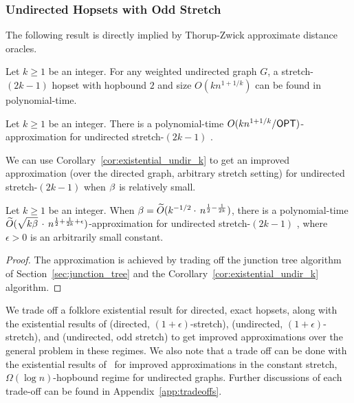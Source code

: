 \subsubsection{Undirected Hopsets with Odd Stretch}

The following result is directly implied by Thorup-Zwick approximate distance oracles.

\begin{lemma}
    Let $k \geq 1$ be an integer. For any weighted undirected graph $G$, a stretch-$(2k-1)$ hopset with hopbound $2$ and size $O(kn^{1+1/k})$ can be found in polynomial-time.
\end{lemma}
\begin{corollary} \label{cor:existential_undir_k}
    Let $k \geq 1$ be an integer. There is a polynomial-time $O(kn^{1+1/k} / {{\sf OPT}})$-approximation for undirected stretch-$(2k-1)$ {\hopset}.
\end{corollary}

We can use Corollary~\ref{cor:existential_undir_k} to get an improved approximation (over the directed graph, arbitrary stretch setting) for undirected stretch-$(2k-1)$ {\hopset} when $\beta$ is relatively small.

\begin{theorem} \label{thm:undir_gen_stretch}
    Let $k \geq 1$ be an integer. When $\beta = \widetilde{O}(k^{-1/2} \cdot \, n^{\frac{1}{2} - \frac{1}{2k}}) $, there is a polynomial-time $\widetilde{O}(\sqrt{k \be \vphantom{\be^k}} \, \cdot \, n^{\frac{1}{2} + \frac{1}{2k} + \epsilon})$-approximation for undirected stretch-$(2k-1)$ {\hopset}, where $\epsilon > 0$ is an arbitrarily small constant.
\end{theorem}
\begin{proof}
    The approximation is achieved by trading off the junction tree algorithm of Section~\ref{sec:junction_tree} and the Corollary~\ref{cor:existential_undir_k} algorithm.
\end{proof}

\else 
We trade off a folklore existential result for directed, exact hopsets, along with the existential results of \cite{BW23} (directed, $(1+\epsilon)$-stretch), \cite{EN19} (undirected, $(1+\epsilon)$-stretch), and \cite{TZ05} (undirected, odd stretch) to get improved approximations over the general problem in these regimes. We also note that a trade off can be done with the existential results of~\cite{BP2020} for improved approximations in the constant stretch, $\Omega(\log n)$-hopbound regime for undirected graphs. Further discussions of each trade-off can be found in Appendix~\ref{app:tradeoffs}.

